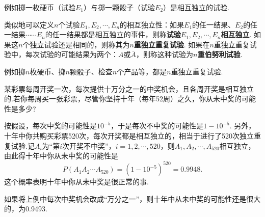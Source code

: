 例如掷一枚硬币（试验$E_1$）与掷一颗骰子（试验$E_2$）是相互独立的试验.

类似地可以定义$n$个试验$E_1,E_2,\cdots,E_n$的相互独立性：如果$E_1$的任一结果、$E_2$的任一结果$\cdots\cdots E_n$的任一结果都是相互独立的事件，则称\textbf{试验$E_1,E_2,\cdots,E_n$相互独立}. 如果这$n$个独立试验还是相同的，则称其为\textbf{$n$重独立重复试验}. 如果在$n$重独立重复试验中，每次试验的可能结果为两个：$A$或$\bar A$，则称这种试验为\textbf{$n$重伯努利试验}. 

例如掷$n$枚硬币、掷$n$颗骰子、检查$n$个产品等，都是$n$重独立重复试验.

\begin{example}
  某彩票每周开奖一次，每次提供十万分之一的中奖机会，且各周开奖是相互独立的.若你每周买一张彩票，尽管你坚持十年（每年52周）之久，你从未中奖的可能性是多少?
\end{example}

\begin{solution}
  按假设，每次中奖的可能性是$10^{-5}$，于是每次不中奖的可能性是$1-10^{-5}$. 另外，十年中你共购买彩票520次，每次开奖都是相互独立的，相当于进行了520次独立重复试验.记$A_i$为“第$i$次开奖不中奖”，$i=1,2,\cdots,520$，则$A_1,A_2,\cdots,A_{520}$相互独立，由此得十年中你从未中奖的可能性是
  \[
    P(A_1A_2\cdots A_{520}) = (1 - 10^{-5})^{520} =  0.9948.
  \]
  这个概率表明十年中你从未中奖是很正常的事.
\end{solution}

如果将上例中每次中奖机会改成“万分之一”，则十年中从未中奖的可能性还是很大的，为0.9493.


